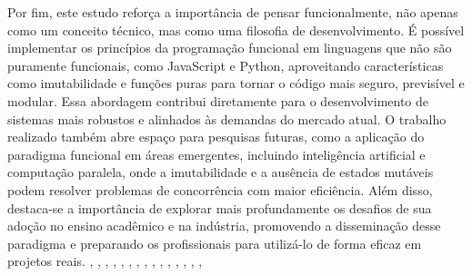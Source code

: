 Por fim, este estudo reforça a importância de pensar funcionalmente, não apenas como um conceito técnico, mas como uma filosofia de desenvolvimento. É possível implementar os princípios da programação funcional em linguagens que não são puramente funcionais, como JavaScript e Python, aproveitando características como imutabilidade e funções puras para tornar o código mais seguro, previsível e modular. Essa abordagem contribui diretamente para o desenvolvimento de sistemas mais robustos e alinhados às demandas do mercado atual.
O trabalho realizado também abre espaço para pesquisas futuras, como a aplicação do paradigma funcional em áreas emergentes, incluindo inteligência artificial e computação paralela, onde a imutabilidade e a ausência de estados mutáveis podem resolver problemas de concorrência com maior eficiência. Além disso, destaca-se a importância de explorar mais profundamente os desafios de sua adoção no ensino acadêmico e na indústria, promovendo a disseminação desse paradigma e preparando os profissionais para utilizá-lo de forma eficaz em projetos reais.
\cite{Hughes90}, \cite{Lipovaca11}, \cite{Kay93}, \cite{Hickey2020}, \cite{Church1936}, \cite{Computerphile2016}, \cite{Higginbotham15}, \cite{Rodrigues2022}, \cite{Codigofonte2024}, \cite{Guedes2020}, \cite{Gamma1995}, \cite{Fowler1999}, \cite{PeytonJones2003}, \cite{Sestoft1997}, \cite{Booch2007}, \cite{Metz2013}



